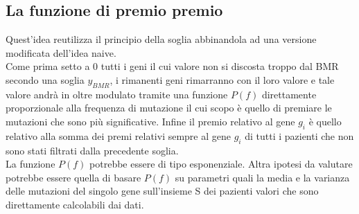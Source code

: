\documentclass[a4paper,11pt]{article}
\begin{document}
\subsection{La funzione di premio premio}
Quest'idea reutilizza il principio della soglia abbinandola ad una versione modificata dell'idea naive.\\
Come prima setto a 0 tutti i geni il cui valore non si discosta troppo dal BMR secondo una soglia $y_{BMR}$, i rimanenti geni rimarranno con il loro valore e tale valore andrà in oltre modulato tramite una funzione $P(f)$ direttamente proporzionale alla frequenza di mutazione il cui scopo è quello di premiare le mutazioni che sono più significative. Infine il premio relativo al gene $g_i$ è quello relativo alla somma dei premi relativi sempre al gene $g_i$ di tutti i pazienti che non sono stati filtrati dalla precedente soglia.\\
La funzione $P(f)$ potrebbe essere di tipo esponenziale. Altra ipotesi da valutare potrebbe essere quella di basare $P(f)$ su parametri quali la media e la varianza delle mutazioni del singolo gene sull'insieme S dei pazienti valori che sono direttamente calcolabili dai dati.
\end{document}
